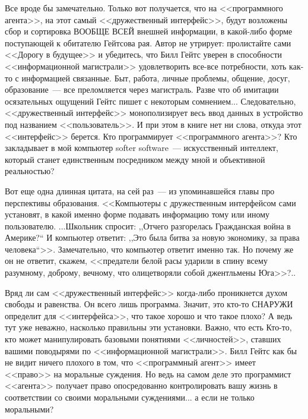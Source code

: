 \documentclass{scrbook}
\newcommand{\glqq}{,,}
\newcommand{\grqq}{``}
\newcommand{\flqq}{<<}
\newcommand{\frqq}{>>}
\newcommand{\mdash}{~--- }
\begin{document}
Все вроде бы замечательно. Только вот получается, что на {\flqq}программного агента{\frqq}, на этот самый {\flqq}дружественный интерфейс{\frqq}, будут возложены сбор и сортировка ВООБЩЕ ВСЕЙ внешней информации, в какой-либо форме поступающей к обитателю Гейтсова рая. Автор не утрирует: пролистайте сами {\flqq}Дорогу в будущее{\frqq} и убедитесь, что Билл Гейтс уверен в способности {\flqq}информационной магистрали{\frqq} удовлетворить все-все потребности, хоть как-то с информацией связанные. Быт, работа, личные проблемы, общение, досуг, образование{\mdash}все преломляется через магистраль. Разве что об имитации осязательных ощущений Гейтс пишет с некоторым сомнением... Следовательно, {\flqq}дружественный интерфейс{\frqq} монополизирует весь ввод данных в устройство под названием {\flqq}пользователь{\frqq}. И при этом в книге нет ни слова, откуда этот {\flqq}интерфейс{\frqq} берется. Кто программирует {\flqq}программного агента{\frqq}? Кто закладывает в мой компьютер softer software{\mdash}искусственный интеллект, который станет единственным посредником между мной и объективной реальностью?

Вот еще одна длинная цитата, на сей раз{\mdash}из упоминавшейся главы про перспективы образования. {\flqq}Компьютеры с дружественным интерфейсом сами установят, в какой именно форме подавать информацию тому или иному пользователю. ...Школьник спросит: {\glqq}Отчего разгорелась Гражданская война в Америке?{\grqq} И компьютер ответит: {\glqq}Это была битва за новую экономику, за права человека{\grqq}{\frqq}. Замечательно, что компьютер ответит именно так. Но почему же он не ответит, скажем, {\flqq}предатели белой расы ударили в спину всему разумному, доброму, вечному, что олицетворяли собой джентльмены Юга{\frqq}?..

Вряд ли сам {\flqq}дружественный интерфейс{\frqq} когда-либо проникнется духом свободы и равенства. Он всего лишь программа. Значит, это кто-то СНАРУЖИ определит для {\flqq}интерфейса{\frqq}, что такое хорошо и что такое плохо? А ведь тут уже неважно, насколько правильны эти установки. Важно, что есть Кто-то, кто может манипулировать базовыми понятиями {\flqq}личностей{\frqq}, ставших вашими поводырями по {\flqq}информационной магистрали{\frqq}. Билл Гейтс как бы не видит ничего плохого в том, что {\flqq}программный агент{\frqq} имеет {\flqq}право{\frqq} на моральные суждения. Но ведь на самом деле это программист {\flqq}агента{\frqq} получает право опосредованно контролировать вашу жизнь в соответствии со своими моральными суждениями... а если не только моральными?
\end{document}
